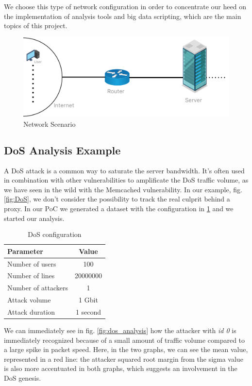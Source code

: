 We choose this type of network configuration in order to concentrate our heed on the implementation of analysis tools and big data scripting, which are the main topics of this project.
 
\begin{figure}[ht]
  \includegraphics[scale=0.31]{imgs/scenario.png}
  \caption{Network Scenario}
  \label{fig:networkscenario}
\end{figure} 
 
\subsection{DoS Analysis Example}
A DoS attack is a common way to saturate the server bandwidth. It's often used in combination with other vulnerabilities to amplificate the DoS traffic volume, as we have seen in the wild with the Memcached vulnerability\cite{memcached_vulnerability}. In our example, fig. \ref{fig:DoS}, we don't consider the possibility to track the real culprit behind a proxy.
In our PoC we generated a dataset with the configuration in \ref{tab:tab:dos_config} and we started our analysis.

\begin{table}[h]
\centering
\begin{tabular}{|l|c|}
\hline
\textbf{Parameter} & \textbf{Value} \\ \hline
 Number of users & 100 \\ 
 Number of lines & 20000000 \\ 
 Number of attackers & 1 \\ 
 Attack volume & 1 Gbit \\
 Attack duration & 1 second \\  
 \hline 
\end{tabular}
\caption{DoS configuration}
\label{tab:tab:dos_config}
\end{table}

We can immediately see in fig. \ref{fig:dos_analysis} how the attacker with \textit{id 0} is immediately recognized because of a small amount of traffic volume compared to a large spike in packet speed. Here, in the two graphs, we can see the mean value, represented in a red line: the attacker squared root margin from the sigma value is also more accentuated in both graphs, which suggests an involvement in the DoS genesis.

